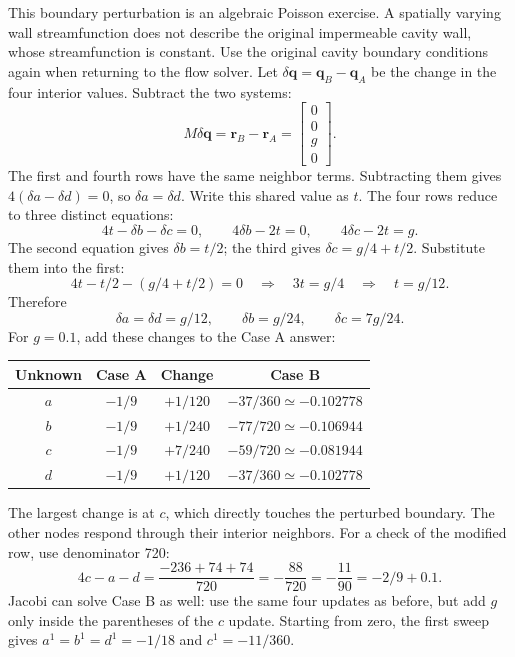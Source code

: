 This boundary perturbation is an algebraic Poisson exercise. A spatially varying
wall streamfunction does not describe the original impermeable cavity wall,
whose streamfunction is constant. Use the original cavity boundary conditions
again when returning to the flow solver.
\newpage
{}
Let $\delta\boldsymbol q=\boldsymbol q_B-\boldsymbol q_A$ be the change in the
four interior values. Subtract the two systems:
\[
M\delta\boldsymbol q=\boldsymbol r_B-\boldsymbol r_A
=\begin{bmatrix}0\\0\\g\\0\end{bmatrix}.
\]
The first and fourth rows have the same neighbor terms. Subtracting them gives
$4(\delta a-\delta d)=0$, so $\delta a=\delta d$. Write this shared value as
$t$. The four rows reduce to three distinct equations:
\[
4t-\delta b-\delta c=0,\qquad
4\delta b-2t=0,\qquad
4\delta c-2t=g.
\]
The second equation gives $\delta b=t/2$; the third gives
$\delta c=g/4+t/2$. Substitute them into the first:
\[
4t-t/2-(g/4+t/2)=0
\quad\Longrightarrow\quad 3t=g/4
\quad\Longrightarrow\quad t=g/12.
\]
Therefore
\[
\delta a=\delta d=g/12,\qquad
\delta b=g/24,\qquad \delta c=7g/24.
\]
For $g=0.1$, add these changes to the Case A answer:
\begin{center}\begin{tabular}{cccc}\toprule
Unknown & Case A & Change & Case B\\\midrule
$a$ & $-1/9$ & $+1/120$ & $-37/360\simeq-0.102778$\\
$b$ & $-1/9$ & $+1/240$ & $-77/720\simeq-0.106944$\\
$c$ & $-1/9$ & $+7/240$ & $-59/720\simeq-0.081944$\\
$d$ & $-1/9$ & $+1/120$ & $-37/360\simeq-0.102778$\\\bottomrule
\end{tabular}\end{center}
The largest change is at $c$, which directly touches the perturbed boundary.
The other nodes respond through their interior neighbors. For a check of the
modified row, use denominator 720:
\[
4c-a-d=\frac{-236+74+74}{720}
=-\frac{88}{720}=-\frac{11}{90}=-2/9+0.1.
\]
Jacobi can solve Case B as well: use the same four updates as before, but add
$g$ only inside the parentheses of the $c$ update. Starting from zero, the first
sweep gives $a^1=b^1=d^1=-1/18$ and $c^1=-11/360$.

